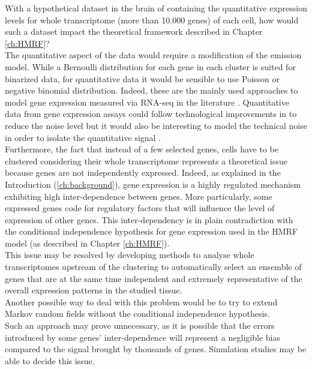   With a hypothetical dataset in the brain of \platy{} containing the quantitative expression levels for whole transcriptome (more than 10.000 genes) of each cell, how would such a dataset impact the theoretical framework described in Chapter \ref{ch:HMRF}?\\
  
  The quantitative aspect of the data would require a modification of the emission model. While a Bernoulli distribution for each gene in each cluster is suited for binarized data, for quantitative data it would be sensible to use Poisson or negative binomial distribution. Indeed, these are the mainly used approaches to model gene expression measured via RNA-seq in the literature \cite{marioni08,anders10}.  Quantitative data from gene expression assays could follow technological improvements in to reduce the noise level but it would also be interesting to model the technical noise in order to isolate the quantitative signal \cite{brennecke13}.\\
  
  Furthermore, the fact that instead of a few selected genes, cells have to be clustered considering their whole transcriptome represents a theoretical issue because genes are not independently expressed. Indeed, as explained in the Introduction (\ref{ch:background}), gene expression is a highly regulated mechanism exhibiting high inter-dependence between genes. More particularly, some expressed genes code for regulatory factors that will influence the level of expression of other genes. This inter-dependency is in plain contradiction with the conditional independence hypothesis for gene expression used in the HMRF model (as described in Chapter \ref{ch:HMRF}).\\
  
  This issue may be resolved by developing methods to analyse whole transcriptomes upstream of the clustering to automatically select an ensemble of genes that are at the same time independent and extremely representative of the overall expression patterns in the studied tissue.\\
  
  Another possible way to deal with this problem would be to try to extend Markov random fields without the conditional independence hypothesis.\\
  
   Such an approach may prove unnecessary, as it is possible that the errors introduced by some genes' inter-dependence will represent a negligible bias compared to the signal brought by thousands of genes. Simulation studies may be able to decide this issue. 





	



